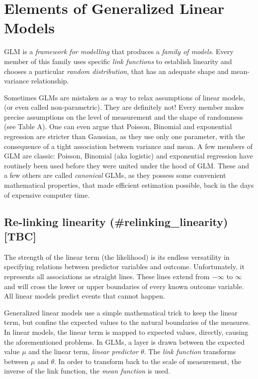 \documentclass[]{svmono}
\begin{document}
\section{Elements of Generalized Linear Models}\label{glm_concepts}

GLM is a \emph{framework for modelling} that produces a \emph{family of
models}. Every member of this family uses specific \emph{link functions}
to establish linearity and chooses a particular \emph{random
distribution}, that has an adequate shape and mean-variance
relationship.

Sometimes GLMs are mistaken as a way to relax assumptions of linear
models, (or even called non-parametric). They are definitely not! Every
member makes precise assumptions on the level of measurement and the
shape of randomness (see Table A). One can even argue that Poisson,
Binomial and exponential regression are stricter than Gaussian, as they
use only one parameter, with the consequence of a tight association
between variance and mean. A few members of GLM are classic: Poisson,
Binomial (aka logistic) and exponential regression have routinely been
used before they were united under the hood of GLM. These and a few
others are called \emph{canonical} GLMs, as they possess some convenient
mathematical properties, that made efficient estimation possible, back
in the days of expensive computer time.

\subsection{Re-linking linearity (\#relinking\_linearity)
{[}TBC{]}}\label{re-linking-linearity-relinking_linearity-tbc}

The strength of the linear term (the likelihood) is its endless
versatility in specifying relations between predictor variables and
outcome. Unfortunately, it represents all associations as straight
lines. These lines extend from \(-\infty\) to \(\infty\) and will cross
the lower or upper boundaries of every known outcome variable. All
linear models predict events that cannot happen.

Generalized linear models use a simple mathematical trick to keep the
linear term, but confine the expected values to the natural boundaries
of the measures. In linear models, the linear term is mapped to expected
values, directly, causing the aforementioned problems. In GLMs, a layer
is drawn between the expected value \(\mu\) and the linear term,
\emph{linear predictor \(\theta\)}. The \emph{link function} transforms
between \(\mu\) and \(\theta\). In order to transform back to the scale
of measurement, the inverse of the link function, the \emph{mean
function} is used.
\end{document}
